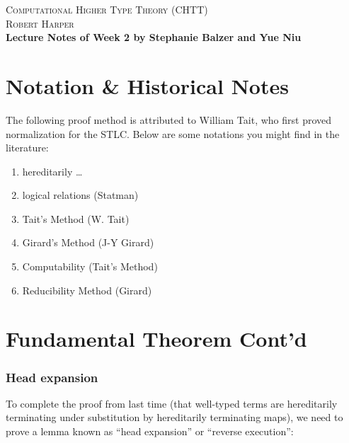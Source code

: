 \documentclass{article}
\begin{document}
\begin{center}
\Large{\scshape Computational Higher Type Theory (CHTT)}\\[2pt]
\large{\scshape Robert Harper}\\[4pt]
\large\bfseries{Lecture Notes of Week 2 by Stephanie Balzer and Yue Niu}
\end{center}

\bigskip

\section{Notation \& Historical Notes}
The following proof method is attributed to William Tait, who first proved normalization for the STLC. Below are some 
notations you might find in the literature:

\begin{enumerate}
\item hereditarily \dots\\
\item logical relations (Statman)\\
\item Tait's Method (W. Tait)\\
\item Girard's Method (J-Y Girard)\\
\item Computability (Tait's Method)\\
\item Reducibility Method (Girard)
\end{enumerate}

\section{Fundamental Theorem Cont'd}

\subsubsection{Head expansion}

To complete the proof from last time (that well-typed terms are hereditarily terminating under substitution by 
hereditarily terminating maps), we need to prove a lemma known as ``head expansion'' or ``reverse execution'':
\end{document}
